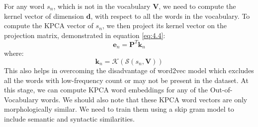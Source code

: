  For any word $s_n$, which is not in the vocabulary $\mathbf{V}$, we need to compute the kernel vector of dimension $\mathbf{d}$, with respect to all the words in the vocabulary. To compute the KPCA vector of $s_n$, we then project its kernel vector on the projection matrix, demonstrated in equation \ref{eq:4.4}:
 \begin{equation}\label{eq:4.4}
 	\mathbf{e}_n =\mathbf{P}^T \mathbf{k}_n
 \end{equation} 
 where:
 \begin{equation}
	 \mathbf{k}_n = \mathcal{K}(\mathcal{S}(s_n,\mathbf{V}))
 \end{equation}
This also helps in overcoming the disadvantage of word2vec model which excludes all the words with low-frequency count or may not be present in the dataset. At this stage, we can compute KPCA word embeddings for any of the Out-of-Vocabulary words. We should also note that these KPCA word vectors are only morphologically similar. We need to train them using a skip gram model to include semantic and syntactic similarities.

